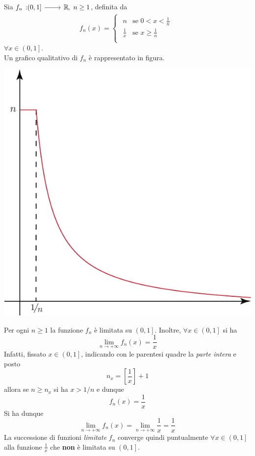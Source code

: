 \begin{example}
	Sia $\funz{f_n}{\left(0,1\right]}{\realset},\ n\geq1$, definita da
	\begin{equation*}
		f_n(x)=\begin{cases}
			\begin{array}{ll}
				n&\text{se }0<x<\frac{1}{n}\\
				\frac{1}{x}&\text{se }x\geq\frac{1}{n}\\
			\end{array}
		\end{cases}
	\end{equation*}
$\forall x\in \left(0,1\right]$.\\
Un grafico qualitativo di $f_n$ è rappresentato in figura.
\begin{center}
	\includegraphics[trim=0cm 0cm 0cm 0cm, clip, scale=0.65]{images/grafico5.pdf}
\end{center}
Per ogni $n\geq1$ la funzione $f_n$ è limitata su $\left(0,1\right]$. Inoltre, $\forall x\in \left(0,1\right]$ si ha
	\begin{equation*}
		\lim_{n\to+\infty}f_n(x)=\frac{1}{x}
	\end{equation*}
	Infatti, fissato $x\in \left(0,1\right]$, indicando con le parentesi quadre la \textit{parte intera} e posto 
	\begin{equation*}
	n_x=\left[\frac{1}{x}\right]+1
	\end{equation*}
	allora se $n\geq n_x$ si ha $x>1/n$ e dunque
	\begin{equation*}
	f_n(x)=\frac{1}{x}
	\end{equation*}
	Si ha dunque
	\begin{equation*}
		\lim_{n\to+\infty}f_n(x)=\lim_{n\to+\infty}\frac{1}{x}=\frac{1}{x}
	\end{equation*}
	La successione di funzioni \textit{limitate} $f_n$ converge quindi puntualmente $\forall x\in \left(0,1\right]$ alla funzione $\frac{1}{x}$ che \textbf{non} è limitata su $\left(0,1\right]$.
\end{example}
